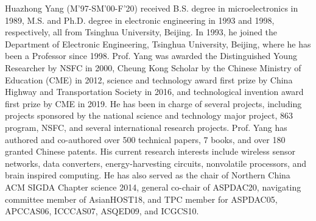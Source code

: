 \documentclass[journal]{IEEEtran}
\begin{document}
\begin{IEEEbiography}{Huazhong Yang}
  \footnotesize
  (M’97-SM’00-F’20) received B.S.   degree in microelectronics in 1989, M.S. and Ph.D.   degree in electronic engineering in 1993 and 1998,   respectively, all from Tsinghua University, Beijing.   In 1993, he joined the Department of Electronic   Engineering, Tsinghua University, Beijing, where   he has been a Professor since 1998. Prof. Yang   was awarded the Distinguished Young Researcher by   NSFC in 2000, Cheung Kong Scholar by the Chinese   Ministry of Education (CME) in 2012, science and   technology award first prize by China Highway and   Transportation Society in 2016, and technological invention award first prize   by CME in 2019. He has been in charge of several projects, including   projects sponsored by the national science and technology major project, 863   program, NSFC, and several international research projects. Prof. Yang has   authored and co-authored over 500 technical papers, 7 books, and over 180   granted Chinese patents. 
  His current research interests include wireless sensor   networks, data converters, energy-harvesting circuits, nonvolatile processors,   and brain inspired computing. 
  He has also served as the chair of Northern   China ACM SIGDA Chapter science 2014, general co-chair of ASPDAC20,   navigating committee member of AsianHOST18, and TPC member for ASPDAC05, APCCAS06, ICCCAS07, ASQED09, and ICGCS10.  
\end{IEEEbiography}






\end{document}
